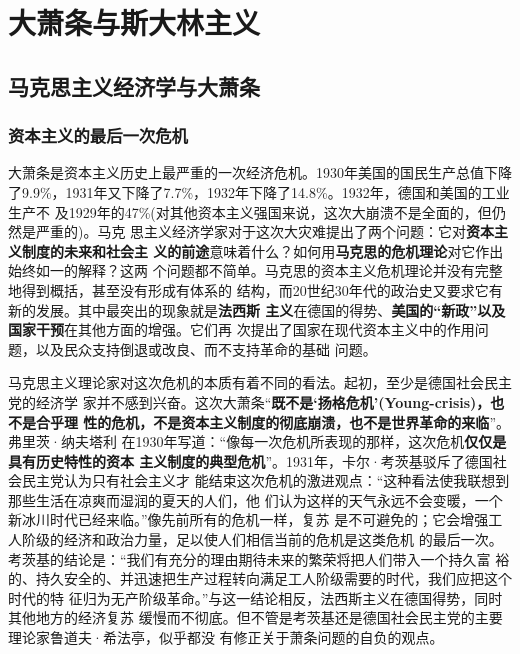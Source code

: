 \part{大萧条与斯大林主义}

\chapter{马克思主义经济学与大萧条}
\section{资本主义的最后一次危机}
大萧条是资本主义历史上最严重的一次经济危机。1930年美国的国民生产总值下降
了9.9\%，1931年又下降了7.7\%，1932年下降了14.8\%。1932年，德国和美国的工业生产不
及1929年的47\%(对其他资本主义强国来说，这次大崩溃不是全面的，但仍然是严重的)。马克
思主义经济学家对于这次大灾难提出了两个问题：它对\textbf{资本主义制度的未来和社会主
义的前途}意味着什么？如何用\textbf{马克思的危机理论}对它作出始终如一的解释？这两
个问题都不简单。马克思的资本主义危机理论并没有完整地得到概括，甚至没有形成有体系的
结构，而20世纪30年代的政治史又要求它有新的发展。其中最突出的现象就是\textbf{法西斯
主义}在德国的得势、\textbf{美国的“新政”以及国家干预}在其他方面的增强。它们再
次提出了国家在现代资本主义中的作用问题，以及民众支持倒退或改良、而不支持革命的基础
问题。

马克思主义理论家对这次危机的本质有着不同的看法。起初，至少是德国社会民主党的经济学
家并不感到兴奋。这次大萧条“\textbf{既不是‘扬格危机’(Young-crisis)，也不是合乎理
性的危机，不是资本主义制度的彻底崩溃，也不是世界革命的来临}”。弗里茨·纳夫塔利
在1930年写道：“像每一次危机所表现的那样，这次危机\textbf{仅仅是具有历史特性的资本
主义制度的典型危机}”。1931年，卡尔·考茨基驳斥了德国社会民主党认为只有社会主义才
能结束这次危机的激进观点：“这种看法使我联想到那些生活在凉爽而湿润的夏天的人们，他
们认为这样的天气永远不会变暖，一个新冰川时代已经来临。”像先前所有的危机一样，复苏
是不可避免的；它会增强工人阶级的经济和政治力量，足以使人们相信当前的危机是这类危机
的最后一次。考茨基的结论是：“我们有充分的理由期待未来的繁荣将把人们带入一个持久富
裕的、持久安全的、并迅速把生产过程转向满足工人阶级需要的时代，我们应把这个时代的特
征归为无产阶级革命。”与这一结论相反，法西斯主义在德国得势，同时其他地方的经济复苏
缓慢而不彻底。但不管是考茨基还是德国社会民主党的主要理论家鲁道夫·希法亭，似乎都没
有修正关于萧条问题的自负的观点。

